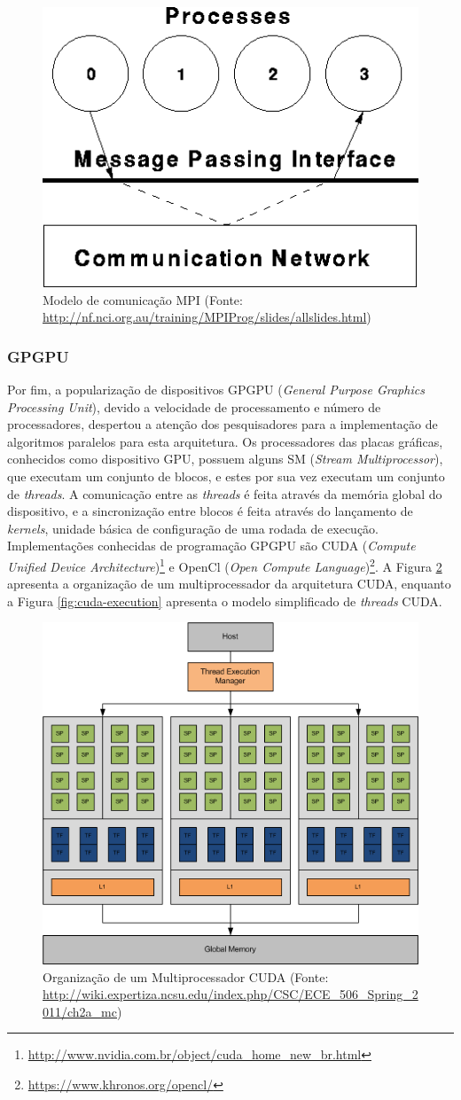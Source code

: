 \documentclass[a4paper, 12pt] {article}
\begin{document}
\begin{figure}[ht]
\centering
\includegraphics[width=.35\textwidth]{mpi.png}
\caption{Modelo de comunicação MPI (Fonte:
\url{http://nf.nci.org.au/training/MPIProg/slides/allslides.html})}
\label{fig:mpi}
\end{figure}

\subsubsection{GPGPU}

Por fim, a popularização de dispositivos GPGPU (\textit{General Purpose Graphics
Processing Unit}), devido a velocidade de processamento e número de
processadores, despertou a atenção dos pesquisadores para a implementação de
algoritmos paralelos para esta arquitetura. Os processadores das placas gráficas, conhecidos como dispositivo GPU, possuem
alguns SM (\textit{Stream Multiprocessor}), que executam um conjunto de blocos, e estes
por sua vez executam um conjunto de \textit{threads}. A comunicação entre as
\textit{threads} é feita através da memória global do dispositivo, e a
sincronização entre blocos é feita através do lançamento de \textit{kernels},
unidade básica de configuração de uma rodada de execução. Implementações
conhecidas de programação GPGPU são CUDA (\textit{Compute Unified Device
Architecture})\footnote{\url{http://www.nvidia.com.br/object/cuda_home_new_br.html}}
e OpenCl (\textit{Open Compute
Language})\footnote{\url{https://www.khronos.org/opencl/}}. A Figura
\ref{fig:cuda-arranje} apresenta a organização de um multiprocessador da
arquitetura CUDA, enquanto a Figura \ref{fig:cuda-execution} apresenta o modelo
simplificado de \textit{threads} CUDA.

\begin{figure}[ht]
\centering
\includegraphics[width=.4\textwidth]{cuda-arranje.png}
\caption{Organização de um Multiprocessador CUDA (Fonte:
\url{http://wiki.expertiza.ncsu.edu/index.php/CSC/ECE_506_Spring_2011/ch2a_mc}) }
\label{fig:cuda-arranje}
\end{figure}
\end{document}
